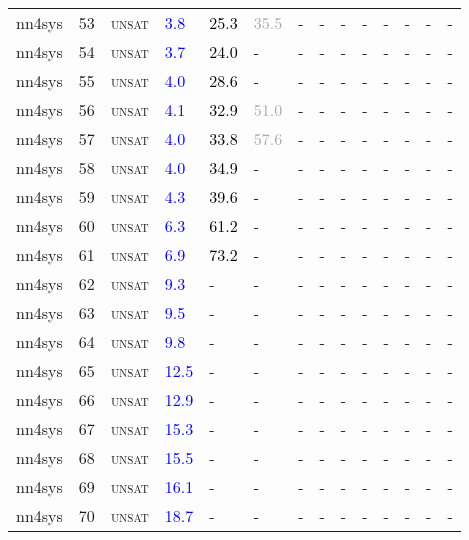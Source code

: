 \begin{center}
{\begin{longtable}{@{}llllllllllllll@{}}
nn4sys & 53 & \textsc{unsat} & \textcolor{blue}{3.8} & \textcolor{black}{25.3} & \textcolor{darkgray}{35.5} & - & - & - & - & - & - & - & - \\
nn4sys & 54 & \textsc{unsat} & \textcolor{blue}{3.7} & \textcolor{black}{24.0} & - & - & - & - & - & - & - & - & - \\
nn4sys & 55 & \textsc{unsat} & \textcolor{blue}{4.0} & \textcolor{black}{28.6} & - & - & - & - & - & - & - & - & - \\
nn4sys & 56 & \textsc{unsat} & \textcolor{blue}{4.1} & \textcolor{black}{32.9} & \textcolor{darkgray}{51.0} & - & - & - & - & - & - & - & - \\
nn4sys & 57 & \textsc{unsat} & \textcolor{blue}{4.0} & \textcolor{black}{33.8} & \textcolor{darkgray}{57.6} & - & - & - & - & - & - & - & - \\
nn4sys & 58 & \textsc{unsat} & \textcolor{blue}{4.0} & \textcolor{black}{34.9} & - & - & - & - & - & - & - & - & - \\
nn4sys & 59 & \textsc{unsat} & \textcolor{blue}{4.3} & \textcolor{black}{39.6} & - & - & - & - & - & - & - & - & - \\
nn4sys & 60 & \textsc{unsat} & \textcolor{blue}{6.3} & \textcolor{black}{61.2} & - & - & - & - & - & - & - & - & - \\
nn4sys & 61 & \textsc{unsat} & \textcolor{blue}{6.9} & \textcolor{black}{73.2} & - & - & - & - & - & - & - & - & - \\
nn4sys & 62 & \textsc{unsat} & \textcolor{blue}{9.3} & - & - & - & - & - & - & - & - & - & - \\
nn4sys & 63 & \textsc{unsat} & \textcolor{blue}{9.5} & - & - & - & - & - & - & - & - & - & - \\
nn4sys & 64 & \textsc{unsat} & \textcolor{blue}{9.8} & - & - & - & - & - & - & - & - & - & - \\
nn4sys & 65 & \textsc{unsat} & \textcolor{blue}{12.5} & - & - & - & - & - & - & - & - & - & - \\
nn4sys & 66 & \textsc{unsat} & \textcolor{blue}{12.9} & - & - & - & - & - & - & - & - & - & - \\
nn4sys & 67 & \textsc{unsat} & \textcolor{blue}{15.3} & - & - & - & - & - & - & - & - & - & - \\
nn4sys & 68 & \textsc{unsat} & \textcolor{blue}{15.5} & - & - & - & - & - & - & - & - & - & - \\
nn4sys & 69 & \textsc{unsat} & \textcolor{blue}{16.1} & - & - & - & - & - & - & - & - & - & - \\
nn4sys & 70 & \textsc{unsat} & \textcolor{blue}{18.7} & - & - & - & - & - & - & - & - & - & - \\

\end{longtable}}
\end{center}
